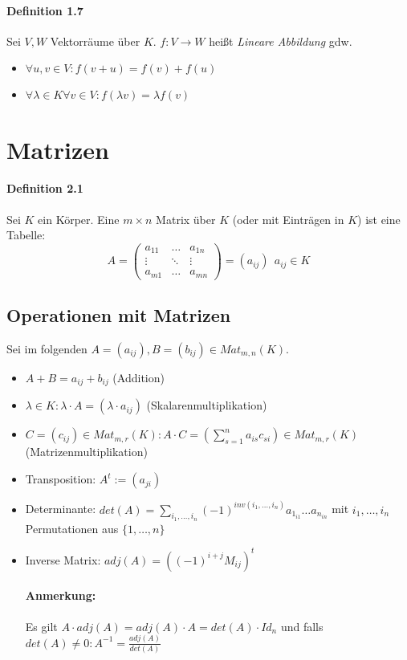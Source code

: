 \documentclass{scrartcl}
\begin{document}
\paragraph{Definition 1.7}
Sei $V,W$ Vektorräume über $K$. $f: V \to W$ heißt \textit{Lineare Abbildung}
gdw.
\begin{itemize}
\item $\forall u,v \in V: f(v + u) = f(v) + f(u)$
\item $\forall \lambda \in K \forall v \in V: f(\lambda v) = \lambda f(v)$
\end{itemize}

\section{Matrizen}
\label{sec:matrizen}

\paragraph{Definition 2.1} Sei $K$ ein Körper. Eine $m \times n$ Matrix über $K$
(oder mit Einträgen in $K$) ist eine Tabelle:
\[
  A = \begin{pmatrix}
      a_{11} & \dots & a_{1n} \\
      \vdots & \ddots & \vdots \\
      a_{m1} & \dots & a_{mn}
    \end{pmatrix} = \left( a_{ij} \right) ~~ a_{ij} \in K
\]

\subsection{Operationen mit Matrizen}
\label{subsec:operationenmitmatrizen}

Sei im folgenden $A = (a_{ij}), B = (b_{ij}) \in Mat_{m,n}(K)$.
\begin{itemize}
\item $A + B = a_{ij} + b_{ij}$ (Addition)
\item $\lambda \in K: \lambda \cdot A = (\lambda \cdot a_{ij})$
  (Skalarenmultiplikation)
\item $C = (c_{ij}) \in Mat_{m,r}(K): A \cdot C = \left(
    \sum_{s=1}^{n}a_{is}c_{si} \right) \in Mat_{m,r}(K)$
  (Matrizenmultiplikation)
\item Transposition: $A^t := (a_{ji})$
\item Determinante: $det(A) = \sum_{i_1, \dots, i_n}(-1)^{inv(i_1, \dots,
    i_n)}a_{1_{i1}} \dots a_{n_{in}}$ mit $i_1, \dots, i_n$ Permutationen aus
  $\{1, \dots, n\}$
   
\item Inverse Matrix: $adj(A) = \left( (-1)^{i+j}M_{ij} \right)^t$
  \paragraph{Anmerkung:} Es gilt $A \cdot
  adj(A) = adj(A) \cdot A = det(A) \cdot Id_n$ und falls $det(A) \neq 0: A^{-1}
  = \frac{adj(A)}{det(A)}$
\end{itemize}
\end{document}
